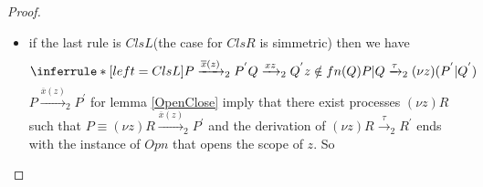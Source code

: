 \begin{theorem}
\begin{proof}
\begin{description}
\begin{itemize}
	      \item
		if the last rule is $ClsL$(the case for $ClsR$ is simmetric) then we have
		\[
		    \inferrule* [left=ClsL]{
			P\xrightarrow{\overline{x}(z)}_{2}P^{'}
		      \\
			Q\xrightarrow{xz}_{2}Q^{'}
		      \\
			z\notin fn(Q)
		    }{
		      P|Q\xrightarrow{\tau}_{2}(\nu z)(P^{'}|Q^{'})
		    }
		\]
		$P\xrightarrow{\overline{x}(z)}_{2}P^{'}$ for lemma \ref{OpenClose} imply that there exist processes $(\nu z)R$ such that $P \equiv (\nu z)R \xrightarrow{\overline{x}(z)}_{2} P^{'}$ and the derivation of $(\nu z)R \xrightarrow{\tau}_{2} R^{'}$ ends with the instance of $Opn$ that opens the scope of $z$. So 

\end{itemize}
\end{description}
\end{proof}
\end{theorem}
